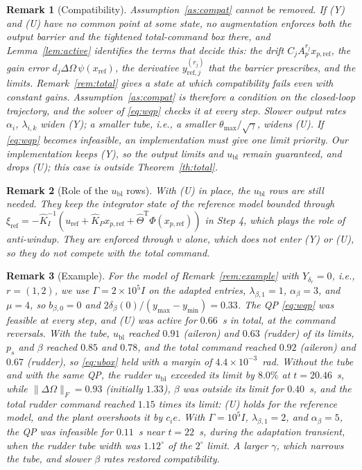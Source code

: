 \documentclass[lettersize,journal]{IEEEtran}
\newtheorem{remark}{Remark}
\newcommand{\Kh}{\hat{K}}
\newcommand{\xr}{x_{\mathrm{ref}}}
\newcommand{\xpr}{x_{p,\mathrm{ref}}}
\newcommand{\ub}{u_{\mathrm{bl}}}
\newcommand{\uref}{u_{\mathrm{ref}}}
\newcommand{\tmax}{\theta_{\max}}
\newcommand{\T}{\mathrm{T}}
\begin{document}
\begin{remark}[Compatibility]
Assumption~\ref{as:compat} cannot be removed. If (Y) and (U) have no common point at some state, no augmentation enforces both the output barrier and the tightened total-command box there, and Lemma~\ref{lem:active} identifies the terms that decide this: the drift $C_jA_p^{r_j}\xpr$, the gain error $d_j\Delta\Omega\,\psi(\xr)$, the derivative $y^{(r_j)}_{\mathrm{ref},j}$ that the barrier prescribes, and the limits. Remark~\ref{rem:total} gives a state at which compatibility fails even with constant gains. Assumption~\ref{as:compat} is therefore a condition on the closed-loop trajectory, and the solver of \eqref{eq:wqp} checks it at every step. Slower output rates $\alpha_i$, $\lambda_{i,k}$ widen (Y); a smaller tube, i.e., a smaller $\tmax/\sqrt\gamma$, widens (U). If \eqref{eq:wqp} becomes infeasible, an implementation must give one limit priority. Our implementation keeps (Y), so the output limits and $\ub$ remain guaranteed, and drops (U); this case is outside Theorem~\ref{th:total}.
\end{remark}

\begin{remark}[Role of the $\ub$ rows]
With (U) in place, the $\ub$ rows are still needed. They keep the integrator state of the reference model bounded through $\xi_{\mathrm{ref}}=-\Kh_I^{-1}(\uref+\Kh_P\xpr+\hat\Theta^\T\Phi(\xpr))$ in Step 4, which plays the role of anti-windup. They are enforced through $v$ alone, which does not enter (Y) or (U), so they do not compete with the total command.
\end{remark}

\begin{remark}[Example] \label{rem:totalexample}
For the model of Remark~\ref{rem:example} with $Y_{\delta_r}=0$, i.e., $r=(1,2)$, we use $\Gamma=2\times10^5I$ on the adapted entries, $\lambda_{\beta,1}=1$, $\alpha_\beta=3$, and $\mu=4$, so $b_{\beta,0}=0$ and $2\delta_\beta(0)/(y_{\max}-y_{\min})=0.33$. The QP \eqref{eq:wqp} was feasible at every step, and (U) was active for $0.66$~s in total, at the command reversals. With the tube, $\ub$ reached $0.91$ (aileron) and $0.63$ (rudder) of its limits, $p_s$ and $\beta$ reached $0.85$ and $0.78$, and the total command reached $0.92$ (aileron) and $0.67$ (rudder), so \eqref{eq:ubox} held with a margin of $4.4\times10^{-3}$~rad. Without the tube and with the same QP, the rudder $\ub$ exceeded its limit by $8.0\%$ at $t=20.46$~s, while $\|\Delta\Omega\|_F=0.93$ (initially $1.33$), $\beta$ was outside its limit for $0.40$~s, and the total rudder command reached $1.15$ times its limit: (U) holds for the reference model, and the plant overshoots it by $c_ie$. With $\Gamma=10^5I$, $\lambda_{\beta,1}=2$, and $\alpha_\beta=5$, the QP was infeasible for $0.11$~s near $t=22$~s, during the adaptation transient, when the rudder tube width was $1.12^\circ$ of the $2^\circ$ limit. A larger $\gamma$, which narrows the tube, and slower $\beta$ rates restored compatibility.
\end{remark}
\end{document}
